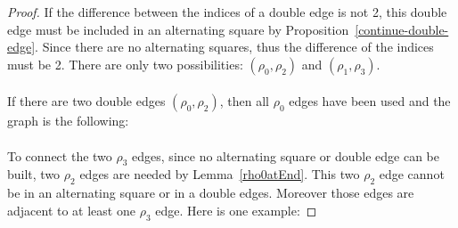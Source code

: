 \begin{proof}
  If the difference between the indices of a double edge is not 2, this double edge must be included in an alternating square by Proposition~\ref{continue-double-edge}. Since there are no alternating squares, thus the difference of the indices must be 2. There are only two possibilities: $(\rho_0, \rho_2)$ and $(\rho_1, \rho_3)$.

  \paragraph{}
  If there are two double edges $(\rho_0, \rho_2)$, then all $\rho_0$ edges have been used and the graph is the following:

  \begin{figure}[H]
    \begin{center}
      \caption{}
    \end{center}
  \end{figure}

  \paragraph{}
  To connect the two $\rho_3$ edges, since no alternating square or double edge can be built, two $\rho_2$ edges are needed by Lemma~\ref{rho0atEnd}. This two $\rho_2$ edge cannot be in an alternating square or in a double edges. Moreover those edges are adjacent to at least one $\rho_3$ edge. Here is one example:


\end{proof}

